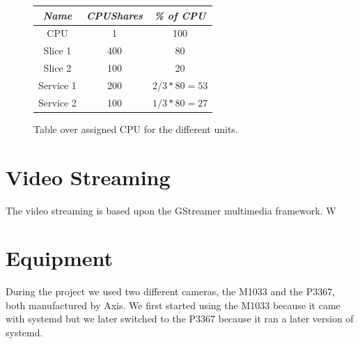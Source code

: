 \documentclass[nobiblatex]{LTHthesis}
\begin{document}
\begin{figure}

\centering
\begin{tabular}{|c|c|c|} \hline
\emph{Name} & \emph{CPUShares} &  \emph{\% of CPU} \\ \hline
CPU & 1 & 100 \\ \hline
Slice 1 & 400 & 80 \\ \hline
Slice 2 & 100 & 20 \\ \hline
Service 1 & 200 & $2/3 * 80 = 53$ \\ \hline
Service 2 & 100 & $1/3 * 80 = 27$\\ \hline
\end{tabular}
\label{ctable}
\caption{Table over assigned CPU for the different units.}

\end{figure}







\section{Video Streaming}
The video streaming is based upon the GStreamer multimedia framework. W

\section{Equipment} %
During the project we used two different cameras, the M1033 and the P3367, both manufactured by Axis. We first started using the M1033 because it came with systemd but we later switched to the P3367 because it ran a later version of systemd.
\end{document}
